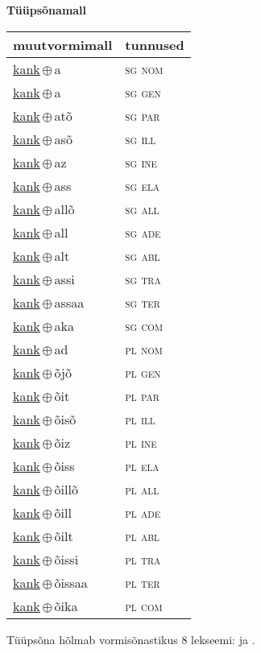 

\vspace{3.5em}
\noindent \begin{minipage}{\textwidth}
\noindent \textbf{Tüüpsõnamall \,}\\

\begin{sideways}
\begin{tabular}{l l}
muutvormimall & tunnused \\
\hline
\underline{kank}\,$\oplus$\,a & \textsc{ sg nom } \\
\underline{kank}\,$\oplus$\,a & \textsc{ sg gen } \\
\underline{kank}\,$\oplus$\,atõ & \textsc{ sg par } \\
\underline{kank}\,$\oplus$\,asõ & \textsc{ sg ill } \\
\underline{kank}\,$\oplus$\,az & \textsc{ sg ine } \\
\underline{kank}\,$\oplus$\,ass & \textsc{ sg ela } \\
\underline{kank}\,$\oplus$\,allõ & \textsc{ sg all } \\
\underline{kank}\,$\oplus$\,all & \textsc{ sg ade } \\
\underline{kank}\,$\oplus$\,alt & \textsc{ sg abl } \\
\underline{kank}\,$\oplus$\,assi & \textsc{ sg tra } \\
\underline{kank}\,$\oplus$\,assaa & \textsc{ sg ter } \\
\underline{kank}\,$\oplus$\,aka & \textsc{ sg com } \\
\underline{kank}\,$\oplus$\,ad & \textsc{ pl nom } \\
\underline{kank}\,$\oplus$\,õjõ & \textsc{ pl gen } \\
\underline{kank}\,$\oplus$\,õit & \textsc{ pl par } \\
\underline{kank}\,$\oplus$\,õisõ & \textsc{ pl ill } \\
\underline{kank}\,$\oplus$\,õiz & \textsc{ pl ine } \\
\underline{kank}\,$\oplus$\,õiss & \textsc{ pl ela } \\
\underline{kank}\,$\oplus$\,õillõ & \textsc{ pl all } \\
\underline{kank}\,$\oplus$\,õill & \textsc{ pl ade } \\
\underline{kank}\,$\oplus$\,õilt & \textsc{ pl abl } \\
\underline{kank}\,$\oplus$\,õissi & \textsc{ pl tra } \\
\underline{kank}\,$\oplus$\,õissaa & \textsc{ pl ter } \\
\underline{kank}\,$\oplus$\,õika & \textsc{ pl com } \\
\end{tabular}
\end{sideways}
\label{tab:tüüpsõnamall-kanka}

\end{minipage}

 
\vspace{1em}
\noindent Tüüpsõna hõlmab vormisõnastikus 8 lekseemi:  ja .
